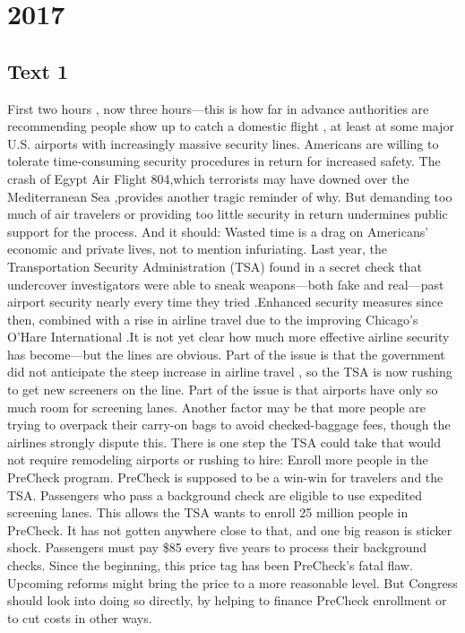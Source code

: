 
\section{2017}
\subsection{Text 1} 
First two hours , now three hours—this is how far in advance authorities are recommending people show up to catch a domestic flight , at least at some major U.S. airports with increasingly massive security lines. 
Americans are willing to tolerate time-consuming security procedures in return for increased safety. The crash of Egypt Air Flight 804,which terrorists may have downed over the Mediterranean Sea ,provides another tragic reminder of why. But demanding too much of air travelers or providing too little security in return undermines public support for the process. And it should: Wasted time is a drag on Americans’ economic and private lives, not to mention infuriating. 
Last year, the Transportation Security Administration (TSA) found in a secret check that undercover investigators were able to sneak weapons---both fake and real—past airport security nearly every time they tried .Enhanced security measures since then, combined with a rise in airline travel due to the improving Chicago’s O’Hare International .It is not yet clear how much more effective airline security has become—but the lines are obvious. 
Part of the issue is that the government did not anticipate the steep increase in airline travel , so the TSA is now rushing to get new screeners on the line. Part of the issue is that airports have only so much room for screening lanes. Another factor may be that more people are trying to overpack their carry-on bags to avoid checked-baggage fees, though the airlines strongly dispute this. 
There is one step the TSA could take that would not require remodeling airports or rushing to hire: Enroll more people in the PreCheck program. PreCheck is supposed to be a win-win for travelers and the TSA. Passengers who pass a background check are eligible to use expedited screening lanes. This allows the TSA wants to enroll 25 million people in PreCheck. 
It has not gotten anywhere close to that, and one big reason is sticker shock. Passengers must pay \$85 every five years to process their background checks. Since the beginning, this price tag has been PreCheck’s fatal flaw. Upcoming reforms might bring the price to a more reasonable level. But Congress should look into doing so directly, by helping to finance PreCheck enrollment or to cut costs in other ways. 
